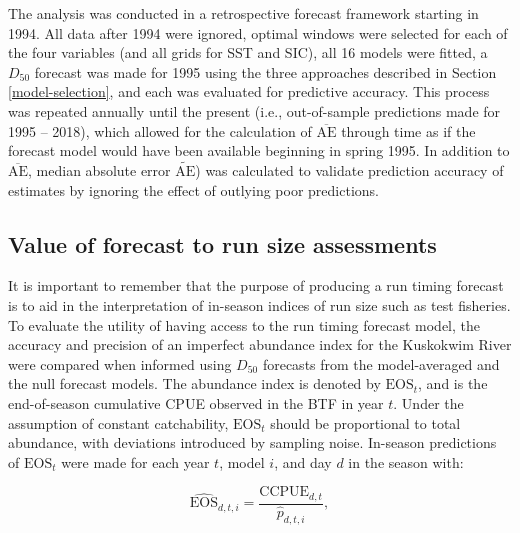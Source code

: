 \documentclass[12pt,]{book}
\theoremstyle{definition}
\theoremstyle{definition}
\theoremstyle{definition}
\theoremstyle{remark}
\begin{document}
\noindent
The analysis was conducted in a retrospective forecast framework
starting in 1994. All data after 1994 were ignored, optimal windows were
selected for each of the four variables (and all grids for SST and SIC),
all 16 models were fitted, a \(D_{50}\) forecast was made for 1995 using
the three approaches described in Section \ref{model-selection}, and
each was evaluated for predictive accuracy. This process was repeated
annually until the present (i.e., out-of-sample predictions made for
1995 -- 2018), which allowed for the calculation of
\(\overline{\text{AE}}\) through time as if the forecast model would
have been available beginning in spring 1995. In addition to
\(\overline{\text{AE}}\), median absolute error
\(\widetilde{\text{AE}}\)) was calculated to validate prediction
accuracy of estimates by ignoring the effect of outlying poor
predictions.

\subsection{Value of forecast to run size assessments}\label{eos-preds}

\noindent
It is important to remember that the purpose of producing a run timing
forecast is to aid in the interpretation of in-season indices of run
size such as test fisheries. To evaluate the utility of having access to
the run timing forecast model, the accuracy and precision of an
imperfect abundance index for the Kuskokwim River were compared when
informed using \(D_{50}\) forecasts from the model-averaged and the null
forecast models. The abundance index is denoted by \(\text{EOS}_t\), and
is the end-of-season cumulative CPUE observed in the BTF in year \(t\).
Under the assumption of constant catchability, \(\text{EOS}_t\) should
be proportional to total abundance, with deviations introduced by
sampling noise. In-season predictions of \(\text{EOS}_t\) were made for
each year \(t\), model \(i\), and day \(d\) in the season with:

\begin{equation}
  \widehat{\text{EOS}}_{d,t,i}=\frac{\text{CCPUE}_{d,t}}{\hat{p}_{d,t,i}},
\label{eq:eos}
\end{equation}
\end{document}
